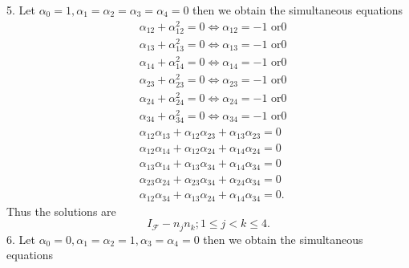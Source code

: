 \documentclass[aps,preprint]{revtex4}%
\begin{document}
5. Let $\alpha_{0}=1,\alpha_{1}=\alpha_{2}=\alpha_{3}=\alpha_{4}=0$ then we
obtain the simultaneous equations%
\begin{align}
&  \alpha_{12}+\alpha_{12}^{2}=0\Leftrightarrow\alpha_{12}=-1\text{ or
}0\nonumber\\
&  \alpha_{13}+\alpha_{13}^{2}=0\Leftrightarrow\alpha_{13}=-1\text{ or
}0\nonumber\\
&  \alpha_{14}+\alpha_{14}^{2}=0\Leftrightarrow\alpha_{14}=-1\text{ or
}0\nonumber\\
&  \alpha_{23}+\alpha_{23}^{2}=0\Leftrightarrow\alpha_{23}=-1\text{ or
}0\nonumber\\
&  \alpha_{24}+\alpha_{24}^{2}=0\Leftrightarrow\alpha_{24}=-1\text{ or
}0\nonumber\\
&  \alpha_{34}+\alpha_{34}^{2}=0\Leftrightarrow\alpha_{34}=-1\text{ or
}0\nonumber\\
&  \alpha_{12}\alpha_{13}+\alpha_{12}\alpha_{23}+\alpha_{13}\alpha
_{23}=0\nonumber\\
&  \alpha_{12}\alpha_{14}+\alpha_{12}\alpha_{24}+\alpha_{14}\alpha
_{24}=0\nonumber\\
&  \alpha_{13}\alpha_{14}+\alpha_{13}\alpha_{34}+\alpha_{14}\alpha
_{34}=0\nonumber\\
&  \alpha_{23}\alpha_{24}+\alpha_{23}\alpha_{34}+\alpha_{24}\alpha
_{34}=0\nonumber\\
&  \alpha_{12}\alpha_{34}+\alpha_{13}\alpha_{24}+\alpha_{14}\alpha_{34}=0.
\end{align}
Thus the solutions are
\[
I_{\mathcal{F}}-n_{j}n_{k};1\leq j<k\leq4.
\]
6. Let $\alpha_{0}=0,\alpha_{1}=\alpha_{2}=1,\alpha_{3}=\alpha_{4}=0$ then we
obtain the simultaneous equations%
\end{document}
